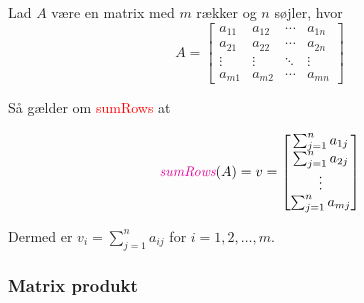 \vspace{0.5cm}
\begin{definition} \label{sumRows}
Lad $A$ være en matrix med $m$ rækker og $n$ søjler, hvor
\[
A = \begin{bmatrix}
a_{11} & a_{12} & \cdots & a_{1n} \\
a_{21} & a_{22} & \cdots & a_{2n} \\
\vdots & \vdots & \ddots & \vdots \\
a_{m1} & a_{m2} & \cdots & a_{mn}
\end{bmatrix}
\]

Så gælder om \textcolor{red}{sumRows} at

\[
\textit{\textcolor{red}{sumRows}}(A) =
v = \begin{bmatrix}
\sum_{j=1}^{n} a_{1j} \\
\sum_{j=1}^{n} a_{2j} \\
\vdots \\
\sum_{j=1}^{n} a_{mj}
\end{bmatrix}
\]

Dermed er $v_i = \sum_{j=1}^{n} a_{ij}$ for $i = 1, 2, \ldots, m$.
\end{definition}

\subsubsection{Matrix produkt}


